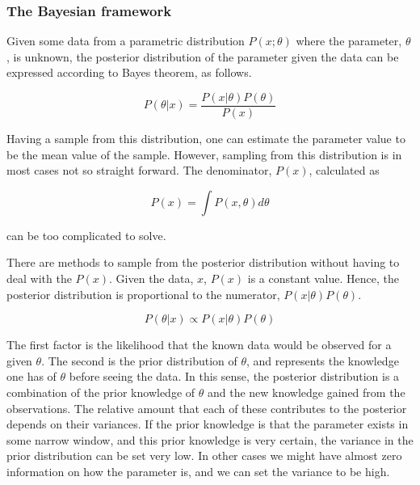 \subsubsection{The Bayesian framework}
\label{Bayesian}

Given some data from a parametric distribution $P(x;\theta)$ where the parameter, $\theta$, is unknown, the posterior distribution of the parameter given the data can be expressed according to Bayes theorem, as follows.

\begin{equation}
    P(\theta | x) = \frac{P(x|\theta)P(\theta)}{P(x)}
\end{equation}

Having a sample from this distribution, one can estimate the parameter value to be the mean value of the sample. However, sampling from this distribution is in most cases not so straight forward. The denominator, $P(x)$, calculated as

\begin{equation}
    P(x) = \int P(x,\theta)d\theta
\end{equation}

can be too complicated to solve. 

There are methods to sample from the posterior distribution without having to deal with the $P(x)$. Given the data, $x$, $P(x)$ is a constant value. Hence, the posterior distribution is proportional to the numerator, $P(x|\theta)P(\theta)$. 

\begin{equation}
    P(\theta | x) \propto P(x|\theta)P(\theta)
\end{equation}

 The first factor is the likelihood that the known data would be observed for a given $\theta$. The second is the prior distribution of $\theta$, and represents the knowledge one has of $\theta$ before seeing the data. In this sense, the posterior distribution is a combination of the prior knowledge of $\theta$ and the new knowledge gained from the observations. The relative amount that each of these contributes to the posterior depends on their variances. If the prior knowledge is that the parameter exists in some narrow window, and this prior knowledge is very certain, the variance in the prior distribution can be set very low. In other cases we might have almost zero information on how the parameter is, and we can set the variance to be high. 

